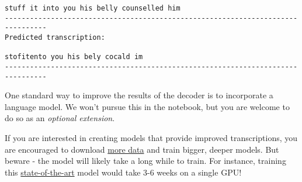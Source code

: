 \documentclass[11pt]{article}
\begin{document}
\begin{Verbatim}[commandchars=\\\{\}]
stuff it into you his belly counselled him
--------------------------------------------------------------------------------
Predicted transcription:

stofitento you his bely cocald im
--------------------------------------------------------------------------------

    \end{Verbatim}

    One standard way to improve the results of the decoder is to incorporate
a language model. We won't pursue this in the notebook, but you are
welcome to do so as an \emph{optional extension}.

If you are interested in creating models that provide improved
transcriptions, you are encouraged to download
\href{http://www.openslr.org/12/}{more data} and train bigger, deeper
models. But beware - the model will likely take a long while to train.
For instance, training this
\href{https://arxiv.org/pdf/1512.02595v1.pdf}{state-of-the-art} model
would take 3-6 weeks on a single GPU!


    
    
    
    
\end{document}
